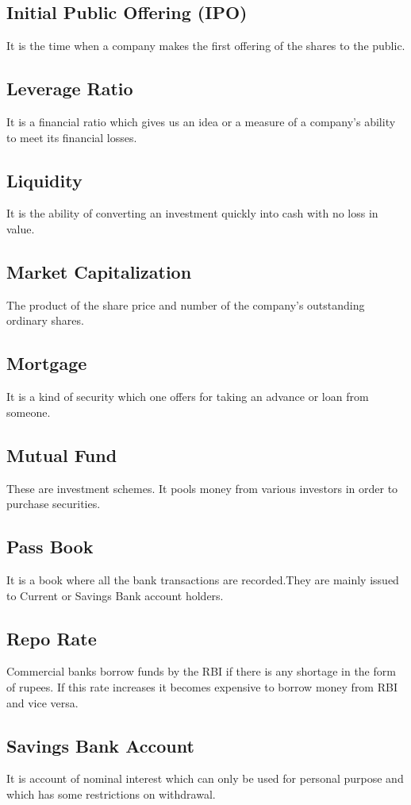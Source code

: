 \documentclass[11pt]{article}
\begin{document}
\subsection{Initial Public Offering (IPO)}
\label{sec:org3370903}
It is the time when a company makes the first offering of the shares
to the public.
\subsection{Leverage Ratio}
\label{sec:orgdcc7b65}
It is a financial ratio which gives us an idea or a measure of a
company’s ability to meet its financial losses.
\subsection{Liquidity}
\label{sec:orgb2d5d6b}
It is the ability of converting an investment quickly into cash with
no loss in value.
\subsection{Market Capitalization}
\label{sec:orgae18824}
The product of the share price and number of the company’s outstanding
ordinary shares.
\subsection{Mortgage}
\label{sec:org029140b}
It is a kind of security which one offers for taking an advance or
loan from someone.
\subsection{Mutual Fund}
\label{sec:org60bf598}
These are investment schemes. It pools money from various investors in
order to purchase securities.
\subsection{Pass Book}
\label{sec:org04f70dd}
It is a book where all the bank transactions are recorded.They are
mainly issued to Current or Savings Bank account holders.
\subsection{Repo Rate}
\label{sec:orgda28c42}
Commercial banks borrow funds by the RBI if there is any shortage in
the form of rupees. If this rate increases it becomes expensive to
borrow money from RBI and vice versa.
\subsection{Savings Bank Account}
\label{sec:org0329477}
It is account of nominal interest which can only be used for personal
purpose and which has some restrictions on withdrawal.
\end{document}
